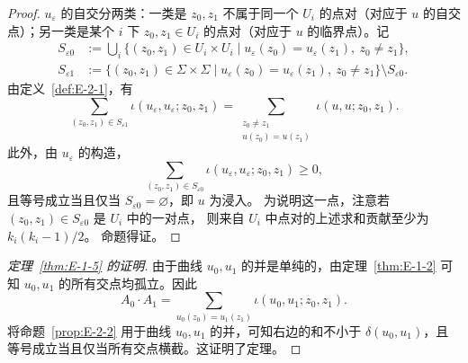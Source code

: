 \begin{proof}
$u_\varepsilon$ 的自交分两类：一类是 $z_0,z_1$ 不属于同一个 $U_i$
的点对（对应于 $u$ 的自交点）；另一类是某个 $i$ 下
$z_0,z_1\in U_i$ 的点对（对应于 $u$ 的临界点）。记
\begin{align*}
  S_{\varepsilon0}
  &:=\bigcup_i\{(z_0,z_1)\in U_i\times U_i\mid
      u_\varepsilon(z_0)=u_\varepsilon(z_1),\ z_0\ne z_1\},\\
  S_{\varepsilon1}
  &:=\{(z_0,z_1)\in\Sigma\times\Sigma\mid
      u_\varepsilon(z_0)=u_\varepsilon(z_1),\ z_0\ne z_1\}
      \setminus S_{\varepsilon0}.
\end{align*}
由定义~\ref{def:E-2-1}，有
\[
  \sum_{(z_0,z_1)\in S_{\varepsilon1}}
    \iota(u_\varepsilon,u_\varepsilon;z_0,z_1)
  =\sum_{\substack{z_0\ne z_1\\u(z_0)=u(z_1)}}
    \iota(u,u;z_0,z_1).
\]
此外，由 $u_\varepsilon$ 的构造，
\[
  \sum_{(z_0,z_1)\in S_{\varepsilon0}}
    \iota(u_\varepsilon,u_\varepsilon;z_0,z_1)\ge0,
\]
且等号成立当且仅当 $S_{\varepsilon0}=\varnothing$，即 $u$ 为浸入。
为说明这一点，注意若 $(z_0,z_1)\in S_{\varepsilon0}$ 是 $U_i$ 中的一对点，
则来自 $U_i$ 中点对的上述求和贡献至少为 $k_i(k_i-1)/2$。
命题得证。
\end{proof}

\begin{proof}[定理~\ref{thm:E-1-5} 的证明]
由于曲线 $u_0,u_1$ 的并是单纯的，由定理~\ref{thm:E-1-2} 可知
$u_0,u_1$ 的所有交点均孤立。因此
\[
  A_0\cdot A_1
  =\sum_{u_0(z_0)=u_1(z_1)}\iota(u_0,u_1;z_0,z_1).
\]
将命题~\ref{prop:E-2-2} 用于曲线 $u_0,u_1$ 的并，可知右边的和不小于
$\delta(u_0,u_1)$，且等号成立当且仅当所有交点横截。这证明了定理。
\end{proof}

